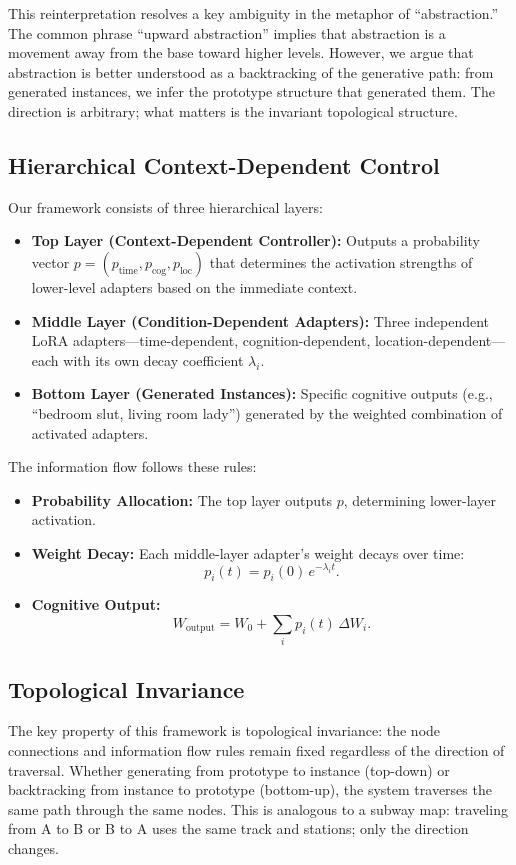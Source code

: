 \documentclass[11pt, a4paper]{article}
\begin{document}
This reinterpretation resolves a key ambiguity in the metaphor of ``abstraction.'' The common phrase ``upward abstraction'' implies that abstraction is a movement away from the base toward higher levels. However, we argue that abstraction is better understood as a backtracking of the generative path: from generated instances, we infer the prototype structure that generated them. The direction is arbitrary; what matters is the invariant topological structure.

\subsection{Hierarchical Context-Dependent Control}
Our framework consists of three hierarchical layers:
\begin{itemize}
  \item \textbf{Top Layer (Context-Dependent Controller):} Outputs a probability vector $p = (p_{\text{time}}, p_{\text{cog}}, p_{\text{loc}})$ that determines the activation strengths of lower-level adapters based on the immediate context.
  \item \textbf{Middle Layer (Condition-Dependent Adapters):} Three independent LoRA adapters---time-dependent, cognition-dependent, location-dependent---each with its own decay coefficient $\lambda_i$.
  \item \textbf{Bottom Layer (Generated Instances):} Specific cognitive outputs (e.g., ``bedroom slut, living room lady'') generated by the weighted combination of activated adapters.
\end{itemize}
The information flow follows these rules:
\begin{itemize}
  \item \textbf{Probability Allocation:} The top layer outputs $p$, determining lower-layer activation.
  \item \textbf{Weight Decay:} Each middle-layer adapter's weight decays over time:
  \[
    p_i(t) = p_i(0)\, e^{-\lambda_i t}.
  \]
  \item \textbf{Cognitive Output:}
  \[
    W_{\text{output}} = W_0 + \sum_i p_i(t)\, \Delta W_i.
  \]
\end{itemize}

\subsection{Topological Invariance}
The key property of this framework is topological invariance: the node connections and information flow rules remain fixed regardless of the direction of traversal. Whether generating from prototype to instance (top-down) or backtracking from instance to prototype (bottom-up), the system traverses the same path through the same nodes. This is analogous to a subway map: traveling from A to B or B to A uses the same track and stations; only the direction changes.
\end{document}
